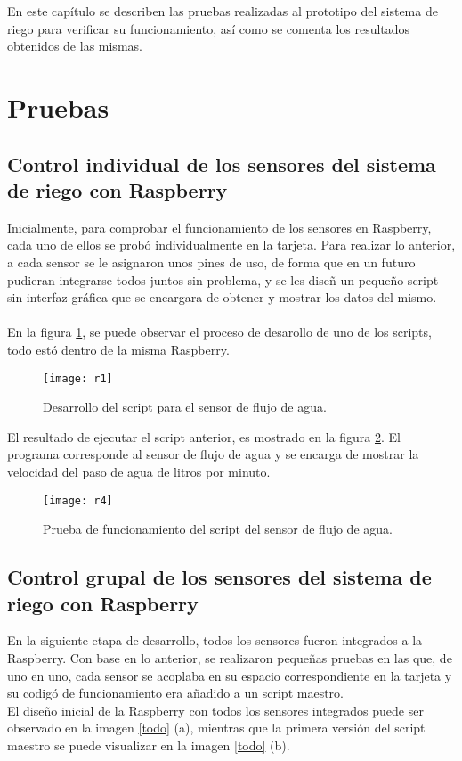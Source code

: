En este cap\'itulo se describen las pruebas realizadas al prototipo del sistema de riego para verificar su funcionamiento, as\'i como se comenta los resultados obtenidos de las mismas. 

\section{Pruebas}

\subsection{Control individual de los sensores del sistema de riego con Raspberry}
Inicialmente, para comprobar el funcionamiento de los sensores en Raspberry, cada uno de ellos se prob\'o individualmente en la tarjeta. Para realizar lo anterior, a cada sensor se le asignaron unos pines de uso, de forma que en un futuro pudieran integrarse todos juntos sin problema, y se les dise\~{n} un peque\~{n}o script sin interfaz gr\'afica que se encargara de obtener y mostrar los datos del mismo.\\\\
En la figura \ref{r1}, se puede observar el proceso de desarollo de uno de los scripts, todo est\'o dentro de la misma Raspberry.
\begin{figure}[H]
\begin{center}
	\texttt{[image: r1]}
\end{center}
	\caption{Desarrollo del script para el sensor de flujo de agua.}
	\label{r1}
\end{figure} 
El resultado de ejecutar el script anterior, es mostrado en la figura \ref{r4}. El programa corresponde al sensor de flujo de agua y se encarga de mostrar la velocidad del paso de agua de litros por minuto.
\begin{figure}[H]
	\begin{center}
		\texttt{[image: r4]}
	\end{center}
	\caption{Prueba de funcionamiento del script del sensor de flujo de agua.}
	\label{r4}
\end{figure} 

\subsection{Control grupal de los sensores del sistema de riego con Raspberry}
En la siguiente etapa de desarrollo, todos los sensores fueron integrados a la Raspberry. Con base en lo anterior, se realizaron peque\~{n}as pruebas en las que, de uno en uno, cada sensor se acoplaba en su espacio correspondiente en la tarjeta y su codig\'o de funcionamiento era a\~{n}adido a un script maestro.\\ 
El dise\~{n}o inicial de la Raspberry con todos los sensores integrados puede ser observado en la imagen \ref{todo} (a), mientras que la primera versi\'on del script maestro se puede visualizar en la imagen \ref{todo} (b). 
 
